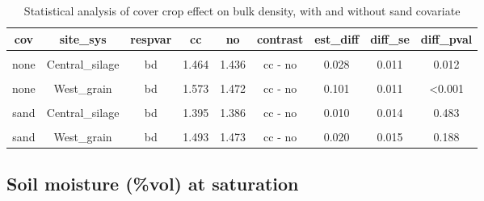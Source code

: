 \documentclass[
]{article}
\begin{document}
\begin{table}[H]

\caption{\label{tab:bulkden}Statistical analysis of cover crop effect on bulk density, with and without sand covariate}
\centering
\begin{tabular}[t]{ccccccccc}
\toprule
cov & site\_sys & respvar & cc & no & contrast & est\_diff & diff\_se & diff\_pval\\
\midrule
\cellcolor{gray!6}{none} & \cellcolor{gray!6}{Central\_grain} & \cellcolor{gray!6}{bd} & \cellcolor{gray!6}{1.422} & \cellcolor{gray!6}{1.374} & \cellcolor{gray!6}{cc - no} & \cellcolor{gray!6}{0.048} & \cellcolor{gray!6}{0.010} & \cellcolor{gray!6}{<0.001}\\
\cmidrule{1-9}
none & Central\_silage & bd & 1.464 & 1.436 & cc - no & 0.028 & 0.011 & 0.012\\
\cmidrule{1-9}
\cellcolor{gray!6}{none} & \cellcolor{gray!6}{East\_grain} & \cellcolor{gray!6}{bd} & \cellcolor{gray!6}{1.437} & \cellcolor{gray!6}{1.488} & \cellcolor{gray!6}{cc - no} & \cellcolor{gray!6}{-0.050} & \cellcolor{gray!6}{0.011} & \cellcolor{gray!6}{<0.001}\\
\cmidrule{1-9}
none & West\_grain & bd & 1.573 & 1.472 & cc - no & 0.101 & 0.011 & <0.001\\
\cmidrule{1-9}
\cellcolor{gray!6}{sand} & \cellcolor{gray!6}{Central\_grain} & \cellcolor{gray!6}{bd} & \cellcolor{gray!6}{1.309} & \cellcolor{gray!6}{1.275} & \cellcolor{gray!6}{cc - no} & \cellcolor{gray!6}{0.033} & \cellcolor{gray!6}{0.013} & \cellcolor{gray!6}{0.011}\\
\cmidrule{1-9}
sand & Central\_silage & bd & 1.395 & 1.386 & cc - no & 0.010 & 0.014 & 0.483\\
\cmidrule{1-9}
\cellcolor{gray!6}{sand} & \cellcolor{gray!6}{East\_grain} & \cellcolor{gray!6}{bd} & \cellcolor{gray!6}{1.653} & \cellcolor{gray!6}{1.752} & \cellcolor{gray!6}{cc - no} & \cellcolor{gray!6}{-0.098} & \cellcolor{gray!6}{0.015} & \cellcolor{gray!6}{<0.001}\\
\cmidrule{1-9}
sand & West\_grain & bd & 1.493 & 1.473 & cc - no & 0.020 & 0.015 & 0.188\\
\bottomrule
\end{tabular}
\end{table}

\hypertarget{soil-moisture-vol-at-saturation}{%
\subsection{Soil moisture (\%vol) at
saturation}\label{soil-moisture-vol-at-saturation}}
\end{document}
